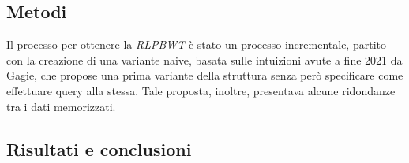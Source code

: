 \documentclass[a4paper,11pt, oneside]{article}
\begin{document}
\subsection*{Metodi}
Il processo per ottenere la \textit{RLPBWT} è stato un processo incrementale,
partito con la creazione di una variante naive, basata sulle intuizioni avute a
fine 2021 da Gagie, che propose una prima variante della struttura senza però
specificare come effettuare query alla stessa. Tale proposta, inoltre,
presentava alcune ridondanze tra i dati memorizzati.\\

\subsection*{Risultati e conclusioni}
\end{document}
